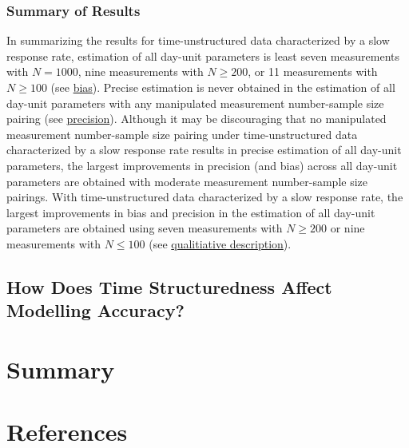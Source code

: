 \documentclass[
12pt, %
twoside,
english]{guelphthesis}
\theoremstyle{definition}
\theoremstyle{definition}
\theoremstyle{definition}
\theoremstyle{definition}
\theoremstyle{remark}
\begin{document}
\hypertarget{summary-of-results-10}{%
\subsubsection{Summary of Results}\label{summary-of-results-10}}

In summarizing the results for time-unstructured data characterized by a slow response rate, estimation of all day-unit parameters is least seven measurements with \(N = 1000\), nine measurements with \(N \ge 200\), or 11 measurements with \(N \ge 100\) (see \protect\hyperlink{bias-slow-exp3}{bias}). Precise estimation is never obtained in the estimation of all day-unit parameters with any manipulated measurement number-sample size pairing (see \protect\hyperlink{precision-slow-exp3}{precision}). Although it may be discouraging that no manipulated measurement number-sample size pairing under time-unstructured data characterized by a slow response rate results in precise estimation of all day-unit parameters, the largest improvements in precision (and bias) across all day-unit parameters are obtained with moderate measurement number-sample size pairings. With time-unstructured data characterized by a slow response rate, the largest improvements in bias and precision in the estimation of all day-unit parameters are obtained using seven measurements with \(N \ge 200\) or nine measurements with \(N \le 100\) (see \protect\hyperlink{qualitative-slow-exp3}{qualitiative description}).

\hypertarget{how-does-time-structuredness-affect-modelling-accuracy}{%
\subsection{How Does Time Structuredness Affect Modelling Accuracy?}\label{how-does-time-structuredness-affect-modelling-accuracy}}

\hypertarget{summary-1}{%
\section{Summary}\label{summary-1}}

\newpage

\hypertarget{references}{%
\section{References}\label{references}}

\begingroup
\end{document}
